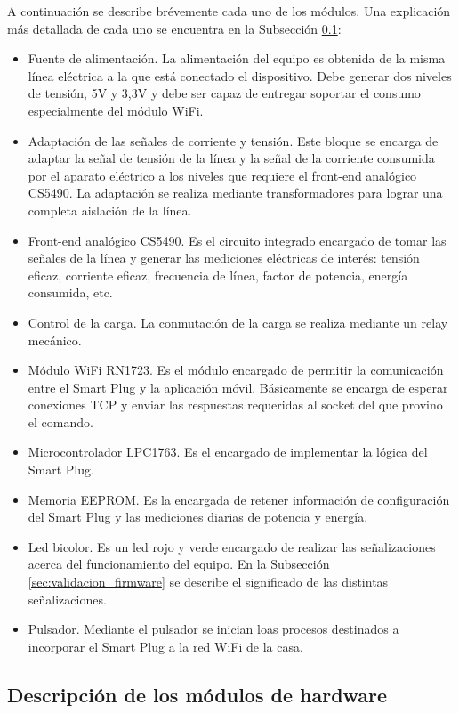 A continuación se describe brévemente cada uno de los módulos. Una explicación más detallada de cada uno se encuentra en la Subsección \ref{subsec:detalles_hardware}:

\begin{itemize}
\item Fuente de alimentación. La alimentación del equipo es obtenida de la misma línea eléctrica a la que está conectado el dispositivo. Debe generar dos niveles de tensión, 5V y 3,3V y debe ser capaz de entregar soportar el consumo especialmente del módulo WiFi.
\item Adaptación de las señales de corriente y tensión. Este bloque se encarga de adaptar la señal de tensión de la línea y la señal de la corriente consumida por el aparato eléctrico a los niveles que requiere el front-end analógico CS5490. La adaptación se realiza mediante transformadores para lograr una completa aislación de la línea.
\item Front-end analógico CS5490. Es el circuito integrado encargado de tomar las señales de la línea y generar las mediciones eléctricas de interés: tensión eficaz, corriente eficaz, frecuencia de línea, factor de potencia, energía consumida, etc.
\item Control de la carga. La conmutación de la carga se realiza mediante un relay mecánico.
\item Módulo WiFi RN1723. Es el módulo encargado de permitir la comunicación entre el Smart Plug y la aplicación móvil. Básicamente se encarga de esperar conexiones TCP y enviar las respuestas requeridas al socket del que provino el comando.
\item Microcontrolador LPC1763. Es el encargado de implementar la lógica del Smart Plug. 
\item Memoria EEPROM. Es la encargada de retener información de configuración del Smart Plug y las mediciones diarias de potencia y energía.
\item Led bicolor. Es un led rojo y verde encargado de realizar las señalizaciones acerca del funcionamiento del equipo. En la Subsección \ref{sec:validacion_firmware} se describe el significado de las distintas señalizaciones.
\item Pulsador. Mediante el pulsador se inician loas procesos destinados a incorporar el Smart Plug a la red WiFi de la casa.
\end{itemize}

\subsection{Descripción de los módulos de hardware}
\label{subsec:detalles_hardware}

